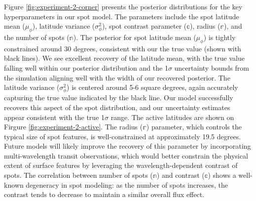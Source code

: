 \documentclass[twocolumn]{aastex631}
\begin{document}
Figure \ref{fig:experiment-2-corner} presents the posterior distributions for the key hyperparameters in our spot model. 
The parameters include the spot latitude mean ($\mu_\phi$), latitude variance ($\sigma^2_\phi$), spot contrast parameter 
($\mathbb{c}$), radius ($\mathbb{r}$), and the number of spots ($\mathbb{n}$).
The posterior for spot latitude mean ($\mu_\phi$) is tightly constrained around 30 degrees, consistent with our 
the true value (shown with black lines). We see excellent recovery of the latitude mean, with the true value falling well 
within our posterior distribution and the 1$\sigma$ uncertainty bounds from the simulation aligning well with the width of 
our recovered posterior. The latitude variance ($\sigma^2_\phi$) is centered around 5-6 square degrees, again accurately 
capturing the true value indicated by the black line. Our model successfully recovers this aspect of the spot distribution, 
and our uncertainty estimates appear consistent with the true 1$\sigma$ range. The active latitudes are shown on Firgure \ref{fig:experiment-2-active}.
The radius ($\mathbb{r}$) parameter, which controls the typical size of spot features, is well-constrained at 
approximately 19.5 degrees. Future models will likely improve the recovery of this parameter by incorporating 
multi-wavelength transit observations, which would better constrain the physical extent of surface features by leveraging 
the wavelength-dependent contrast of spots.
The correlation between number of spots ($\mathbb{n}$) and contrast ($\mathbb{c}$) shows 
a well-known degeneracy in spot modeling: as the number of spots increases, the contrast tends to decrease to 
maintain a similar overall flux effect.
\end{document}
